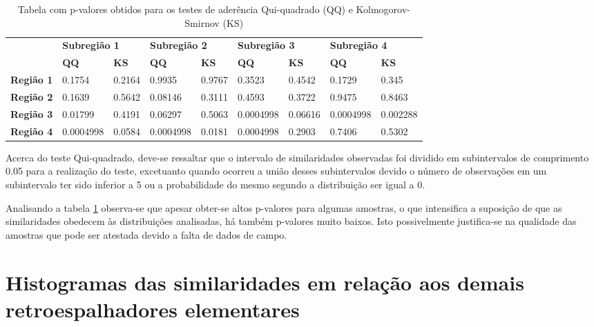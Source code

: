 \documentclass[12pt]{article}
\begin{document}
\begin{table}[!ht]
\centering

    \caption{Tabela com p-valores obtidos para os testes de aderência Qui-quadrado (QQ) e Kolmogorov-Smirnov (KS)}
    \label{tab:pvalues_table}     

    \begin{small}
    \begin{tabular}{|l|l|l|l|l|l|l|l|l|}
    \hline
    & \multicolumn{2}{|l|}{\bfseries Subregião 1} & \multicolumn{2}{l|}{\bfseries Subregião 2} & \multicolumn{2}{|l|}{\bfseries Subregião 3} & \multicolumn{2}{l|}{\bfseries Subregião 4} \\
    & {\bfseries QQ} & {\bfseries KS} & {\bfseries QQ} & {\bfseries KS} & {\bfseries QQ} & {\bfseries KS} & {\bfseries QQ} & {\bfseries KS} \\
    \hline
    {\bfseries Região 1} & 0.1754 & 0.2164 & 0.9935 & 0.9767 & 0.3523 & 0.4542 & 0.1729 & 0.345 \\
    {\bfseries Região 2} & 0.1639 & 0.5642 & 0.08146 & 0.3111 & 0.4593 & 0.3722 & 0.9475 & 0.8463 \\
    {\bfseries Região 3} & 0.01799 & 0.4191 & 0.06297 & 0.5063 & 0.0004998 & 0.06616 & 0.0004998 & 0.002288 \\
    {\bfseries Região 4} & 0.0004998 & 0.0584 & 0.0004998 & 0.0181 & 0.0004998 & 0.2903 & 0.7406 & 0.5302 \\
    \hline
    \end{tabular} 
    \end{small} 
\end{table}

Acerca do teste Qui-quadrado, deve-se ressaltar que o intervalo de similaridades observadas foi dividido em subintervalos de comprimento 0.05 para a realização do teste, excetuanto quando ocorreu a união desses subintervalos devido o número de observações em um subintervalo ter sido inferior a 5 ou a probabilidade do mesmo segundo a distribuição ser igual a 0.

Analisando a tabela \ref{tab:pvalues_table} observa-se que apesar obter-se altos p-valores para algumas amostras, o que intensifica a suposição de que as similaridades obedecem às distribuições analisadas, há também p-valores muito baixos. Isto possivelmente justifica-se na qualidade das amostras que pode ser atestada devido a falta de dados de campo.

\section{Histogramas das similaridades em relação aos demais retroespalhadores elementares}
\end{document}
